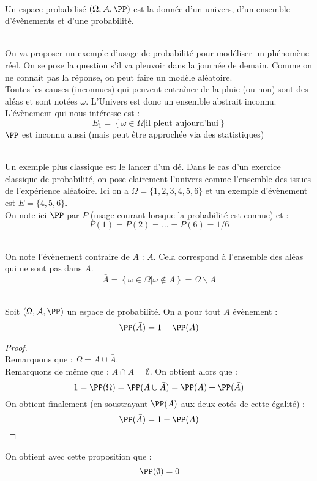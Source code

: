 \documentclass[12pt,fleqn]{report} %
\begin{document}
\begin{definition}\label{Def Espace de Probabilité}\text{ }\\
	Un espace probabilisé $(\Omega,\mathcal{A},\PP)$ est la donnée d'un univers, d'un ensemble d'évènements et d'une probabilité.	\end{definition}


\begin{example}\text{ }\\
	On va proposer un exemple d'usage de probabilité pour modéliser un phénomène réel. On se pose la question s'il va pleuvoir dans la journée de demain. Comme on ne connaît pas la réponse, on peut faire un modèle aléatoire. \\
	Toutes les causes (inconnues) qui peuvent entraîner de la pluie (ou non) sont des aléas et sont notées $\omega$. L'Univers est donc un ensemble abstrait inconnu. \\
	L'évènement qui nous intéresse est : 
	\[
	E_1 = \left\lbrace \omega  \in \Omega | \text{il pleut aujourd'hui} \right\rbrace
	\]
	$\PP$ est inconnu aussi (mais peut être approchée via des statistiques)
\end{example}

\begin{example}\text{ }\\
	Un exemple plus classique est le lancer d'un dé. Dans le cas d'un exercice classique de probabilité, on pose clairement l'univers comme l'ensemble des issues de l'expérience aléatoire. Ici on a 
	$\Omega = \lbrace 1,2,3,4,5,6 \rbrace$ et un exemple d'évènement est $E = \lbrace 4,5,6 \rbrace$.\\
	On note ici $\PP$ par $P$ (usage courant lorsque la probabilité est connue) et :
	\[
	P(1) = P(2) = \dots = P(6) = 1/6
	\]
\end{example}

\begin{definition}\text{ }\\
	On note l'évènement contraire de $A$ : $\bar{A}$. Cela correspond à l'ensemble des aléas qui ne sont pas dans $A$.
	\[
	\bar{A} = \left\lbrace \omega \in \Omega | \omega \notin A \right\rbrace = \Omega \backslash A 
	\]
\end{definition}

\begin{proposition}\text{ }\\
	Soit $(\Omega,\mathcal{A},\PP)$ un espace de probabilité. On a pour tout $A$ évènement : 
	\[
	\PP(\bar{A}) = 1 - \PP(A)
	\]
\end{proposition}
\begin{proof}\text{ }\\
	Remarquons que : $\Omega = A \cup \bar{A}$. \\
	Remarquons de même que : $ A \cap \bar{A} = \emptyset$. On obtient alors que :
	\[
	1 = \PP(\Omega) = \PP(A \cup \bar{A}) = \PP(A) + \PP(\bar{A})
	\]
	On obtient finalement (en soustrayant $\PP(A)$ aux deux cotés de cette égalité) : 
	\[
	\PP(\bar{A}) = 1 - \PP(A)
	\]
\end{proof}
\begin{remark}
	On obtient avec cette proposition que :
	\[
	\PP(\emptyset) = 0
	\]
\end{remark}
\end{document}
